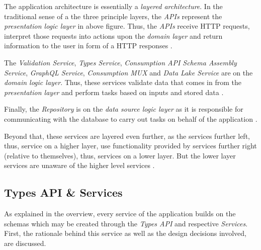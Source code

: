 The application architecture is essentially a \emph{layered architecture}. In the traditional sense of a the three principle layers, the \emph{APIs} represent the \emph{presentation logic layer} in above figure. Thus, the \emph{APIs} receive HTTP requests, interpret those requests into actions upon the \emph{domain layer} and return information to the user in form of a HTTP responses \cite{AppArchitecture}.\par
The \emph{Validation Service}, \emph{Types Service}, \emph{Consumption API Schema Assembly Service}, \emph{GraphQL Service}, \emph{Consumption MUX} and \emph{Data Lake Service} are on the \emph{domain logic layer}. Thus, these services validate data that comes in from the \emph{presentation layer} and perform tasks based on inputs and stored data \cite{AppArchitecture}.\par
Finally, the \emph{Repository} is on the \emph{data source logic layer} as it is responsible for communicating with the database to carry out tasks on behalf of the application \cite{AppArchitecture}.\par
Beyond that, these services are layered even further, as the services further left, thus, service on a higher layer, use functionality provided by services further right (relative to themselves), thus, services on a lower layer. But the lower layer services are unaware of the higher level services \cite{AppArchitecture}.

\subsection{Types API \& Services} \label{sec:Types API & Services}
As explained in the overview, every service of the application builds on the schemas which may be created through the \emph{Types API} and respective \emph{Services}. First, the rationale behind this service as well as the design decisions involved, are discussed.\par

